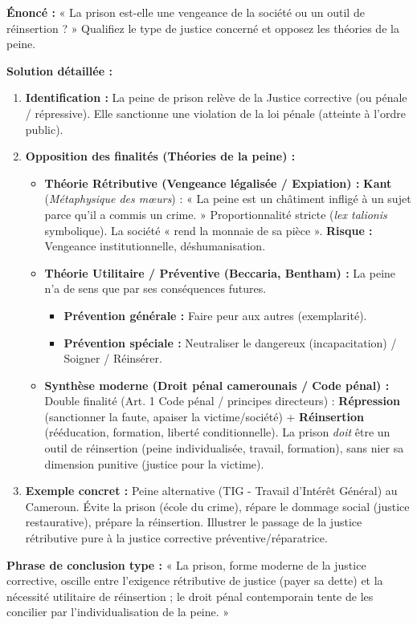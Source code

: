 \documentclass[11pt]{article}
\newcommand{\cle}[1]{{\popxbold\color{popdark}#1}}
\begin{document}
\begin{exoresolu}
\textbf{Énoncé :} « La prison est-elle une vengeance de la société ou un outil de réinsertion ? » Qualifiez le type de justice concerné et opposez les théories de la peine.

\tcblower
\textbf{Solution détaillée :}
\begin{enumerate}
    \item \textbf{Identification :} La peine de prison relève de la \cle{Justice corrective (ou pénale / répressive)}. Elle sanctionne une violation de la loi pénale (atteinte à l'ordre public).
    \item \textbf{Opposition des finalités (Théories de la peine) :}
    \begin{itemize}
        \item \textbf{Théorie Rétributive (Vengeance légalisée / Expiation) :} \textbf{Kant} (\textit{Métaphysique des mœurs}) : « La peine est un châtiment infligé à un sujet parce qu'il a commis un crime. » Proportionnalité stricte (\textit{lex talionis} symbolique). La société « rend la monnaie de sa pièce ». \textbf{Risque :} Vengeance institutionnelle, déshumanisation.
        \item \textbf{Théorie Utilitaire / Préventive (Beccaria, Bentham) :} La peine n'a de sens que par ses \cle{conséquences futures}.
            \begin{itemize}
                \item \textbf{Prévention générale :} Faire peur aux autres (exemplarité).
                \item \textbf{Prévention spéciale :} Neutraliser le dangereux (incapacitation) / Soigner / Réinsérer.
            \end{itemize}
        \item \textbf{Synthèse moderne (Droit pénal camerounais / Code pénal) :} \cle{Double finalité} (Art. 1 Code pénal / principes directeurs) : \textbf{Répression} (sanctionner la faute, apaiser la victime/société) + \textbf{Réinsertion} (rééducation, formation, liberté conditionnelle). La prison \emph{doit} être un outil de réinsertion (peine individualisée, travail, formation), sans nier sa dimension punitive (justice pour la victime).
    \end{itemize}
    \item \textbf{Exemple concret :} Peine alternative (TIG - Travail d'Intérêt Général) au Cameroun. Évite la prison (école du crime), répare le dommage social (justice restaurative), prépare la réinsertion. Illustrer le passage de la justice rétributive pure à la justice corrective préventive/réparatrice.
\end{enumerate}
\textbf{Phrase de conclusion type :} « La prison, forme moderne de la justice corrective, oscille entre l'exigence rétributive de justice (payer sa dette) et la nécessité utilitaire de réinsertion ; le droit pénal contemporain tente de les concilier par l'individualisation de la peine. »
\end{exoresolu}
\end{document}
